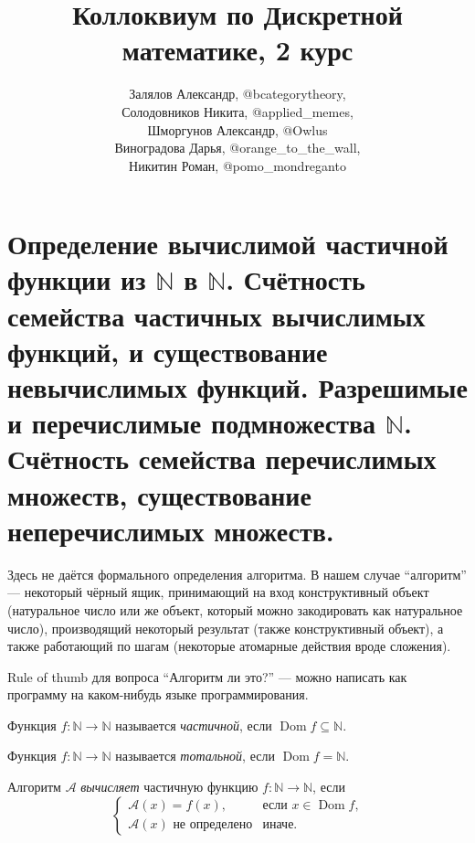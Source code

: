 \documentclass{article}
\title{Коллоквиум по Дискретной математике, 2 курс}
\author{Залялов Александр, @bcategorytheory,\\  Солодовников Никита, @applied\_memes, \\ Шморгунов Александр, @Owlus \\
Виноградова Дарья, @orange\_to\_the\_wall, \\ Никитин Роман, @pomo\_mondreganto}
\date{}
\begin{document}
    \maketitle

    \tableofcontents

    \clearpage

    \section{Определение вычислимой частичной функции из $\mathbb{N}$ в $\mathbb{N}$.
    Счётность семейства частичных вычислимых функций, и существование невычислимых функций.
    Разрешимые и перечислимые подмножества $\mathbb{N}$. Счётность семейства перечислимых множеств,
    существование неперечислимых множеств.}

    Здесь не даётся формального определения алгоритма. В нашем случае ``алгоритм'' --- некоторый
    чёрный ящик, принимающий на вход конструктивный объект (натуральное число или же объект, который
    можно закодировать как натуральное число), производящий некоторый результат (также конструктивный
    объект), а также работающий по шагам (некоторые атомарные действия вроде сложения).

    Rule of thumb для вопроса ``Алгоритм ли это?'' --- можно написать как программу на каком-нибудь
    языке программирования.

    \begin{definition}
        Функция $f: \mathbb{N} \to \mathbb{N}$ называется \textit{частичной}, если $\operatorname{Dom} f \subseteq \mathbb{N}$.
    \end{definition}

    \begin{definition}
        Функция $f: \mathbb{N} \to \mathbb{N}$ называется \textit{тотальной}, если $\operatorname{Dom} f = \mathbb{N}.$
    \end{definition}

    \begin{definition}
        Алгоритм $\mathcal{A}$ \textit{вычисляет} частичную функцию $f: \mathbb{N} \to \mathbb{N}$, если
        $$
            \begin{cases}
                \mathcal{A}(x) = f(x), & \text{если $x \in \operatorname{Dom} f$,}\\
                \mathcal{A}(x) \text{ не определено} & \text{иначе.}
            \end{cases}
        $$
    \end{definition}
\end{document}
